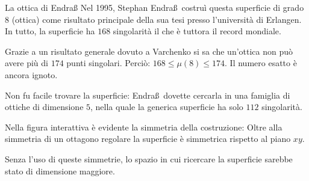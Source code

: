 \begin{surferPage}{La ottica di Endra\ss}
     Nel 1995, Stephan Endra\ss\ costru\`i questa superficie di grado $8$ (ottica) come risultato principale della sua tesi presso l'universit\`a di Erlangen.
    In tutto, la superficie ha $168$ singolarit\`a il che \`e tuttora il record mondiale. 
  
     Grazie a un risultato generale dovuto a Varchenko si sa che un'ottica non pu\`o avere pi\`u di $174$ punti singolari.
    Perci\`o: $168 \le \mu(8) \le 174$. 
    Il numero esatto \`e ancora ignoto.

     Non fu facile trovare la superficie: Endra\ss\ dovette cercarla in una famiglia di ottiche di dimensione $5$, nella quale la generica superficie ha solo $112$ singolarit\`a.

    Nella figura interattiva \`e evidente la simmetria della costruzione: 
    Oltre alla simmetria di un ottagono regolare la superficie \`e simmetrica rispetto al piano $xy$.

    Senza l'uso di queste simmetrie, lo spazio in cui ricercare la superficie sarebbe stato di dimensione maggiore.
\end{surferPage}
